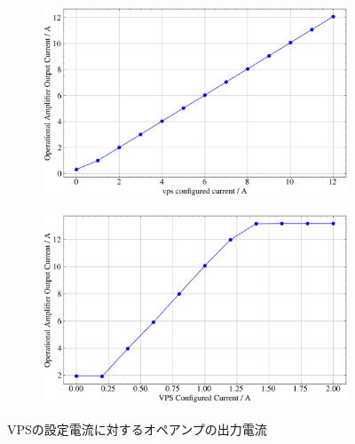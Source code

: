 \begin{figure}[!htp]
	\centering
	\begin{subfigure}{0.48\linewidth}
		\centering
		\includegraphics[width=0.8\linewidth]{src/figures/exp3/vps-op-amp-10k.png}
		\label{subfig:exp3-10k}
	\end{subfigure}
	\begin{subfigure}{0.48\linewidth}
		\centering
		\includegraphics[width=0.8\linewidth]{src/figures/exp3/vps-op-amp-1k.png}
		\label{subfig:exp3-1k}
	\end{subfigure}
	\caption{VPSの設定電流に対するオペアンプの出力電流}\label{fig:exp3}
\end{figure}
